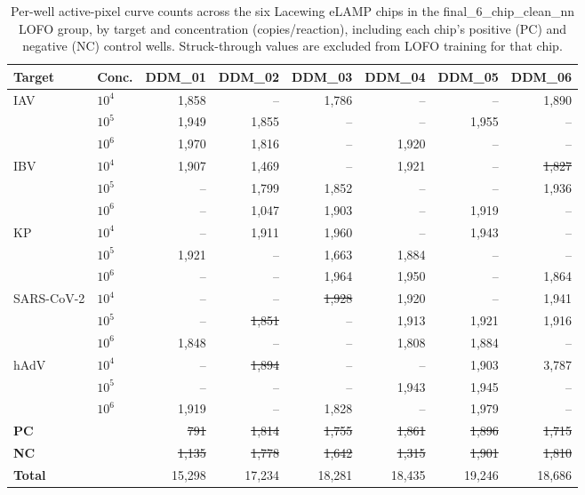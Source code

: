 \begin{table}[htbp]
    \centering
    \caption{Per-well active-pixel curve counts across the six Lacewing eLAMP chips in the final\_6\_chip\_clean\_nn LOFO group, by target and concentration (copies/reaction), including each chip's positive (PC) and negative (NC) control wells. Struck-through values are excluded from LOFO training for that chip.}
    \label{tab:final_6chip_profile}
    \small
    \begin{tabular}{@{}llrrrrrr@{}}
    \toprule
    \textbf{Target} & \textbf{Conc.} & \textbf{DDM_01} & \textbf{DDM_02} & \textbf{DDM_03} & \textbf{DDM_04} & \textbf{DDM_05} & \textbf{DDM_06} \\
    \midrule
    \multirow{3}{*}{IAV} & $10^4$ & 1,858 & -- & 1,786 & -- & -- & 1,890 \\
     & $10^5$ & 1,949 & 1,855 & -- & -- & 1,955 & -- \\
     & $10^6$ & 1,970 & 1,816 & -- & 1,920 & -- & -- \\
    \midrule
    \multirow{3}{*}{IBV} & $10^4$ & 1,907 & 1,469 & -- & 1,921 & -- & \sout{1,827} \\
     & $10^5$ & -- & 1,799 & 1,852 & -- & -- & 1,936 \\
     & $10^6$ & -- & 1,047 & 1,903 & -- & 1,919 & -- \\
    \midrule
    \multirow{3}{*}{KP} & $10^4$ & -- & 1,911 & 1,960 & -- & 1,943 & -- \\
     & $10^5$ & 1,921 & -- & 1,663 & 1,884 & -- & -- \\
     & $10^6$ & -- & -- & 1,964 & 1,950 & -- & 1,864 \\
    \midrule
    \multirow{3}{*}{SARS-CoV-2} & $10^4$ & -- & -- & \sout{1,928} & 1,920 & -- & 1,941 \\
     & $10^5$ & -- & \sout{1,851} & -- & 1,913 & 1,921 & 1,916 \\
     & $10^6$ & 1,848 & -- & -- & 1,808 & 1,884 & -- \\
    \midrule
    \multirow{3}{*}{hAdV} & $10^4$ & -- & \sout{1,894} & -- & -- & 1,903 & 3,787 \\
     & $10^5$ & -- & -- & -- & 1,943 & 1,945 & -- \\
     & $10^6$ & 1,919 & -- & 1,828 & -- & 1,979 & -- \\
    \midrule
    \multicolumn{2}{l}{\textbf{PC}} & \sout{791} & \sout{1,814} & \sout{1,755} & \sout{1,861} & \sout{1,896} & \sout{1,715} \\
    \multicolumn{2}{l}{\textbf{NC}} & \sout{1,135} & \sout{1,778} & \sout{1,642} & \sout{1,315} & \sout{1,901} & \sout{1,810} \\
    \midrule
    \multicolumn{2}{l}{\textbf{Total}} & 15,298 & 17,234 & 18,281 & 18,435 & 19,246 & 18,686 \\
    \bottomrule
    \end{tabular}
\end{table}
